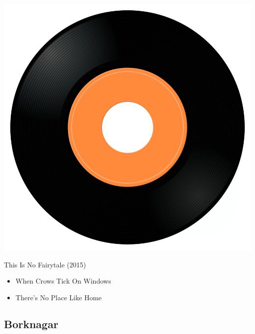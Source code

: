\begin{minipage}[t]{0.25\textwidth}
\captionsetup{type=figure}
\includegraphics[width=\textwidth]{Images/cover.png}
\caption*{This Is No Fairytale (2015)}
\end{minipage}
\begin{minipage}[t]{0.25\textwidth}\vspace{0pt}
\begin{itemize}[nosep,leftmargin=1em,labelwidth=*,align=left]
	\setlength{\itemsep}{0pt}
	\item When Crows Tick On Windows
	\item There's No Place Like Home
\end{itemize}
\end{minipage}

\subsection{Borknagar}

